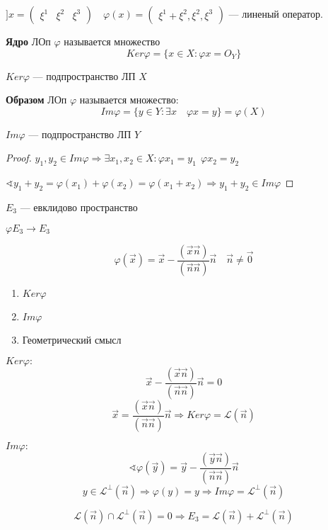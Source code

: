 

\cfoot{}



$] x = \begin{pmatrix}
    \xi^1 & \xi^2 & \xi^3
\end{pmatrix} \quad \varphi(x) = \begin{pmatrix}
    \xi^1+\xi^2, \xi^2, \xi^3
\end{pmatrix}$ --- линеный оператор.

\begin{definition}
    \textbf{Ядро} ЛОп $\varphi$ называется множество
    $$Ker \varphi = \{ x\in X : \varphi x = O_Y\}$$
\end{definition}
\begin{remark}
    $Ker \varphi$ --- подпространство ЛП $X$
\end{remark}

\begin{definition}
    \textbf{Образом} ЛОп $\varphi$ называется множество:
    $$Im \varphi = \{y\in Y : \exists x \quad \varphi x = y\} = \varphi(X)$$
\end{definition}
\begin{remark}
    $Im \varphi$ --- подпространство ЛП $Y$
\end{remark}
\begin{proof}
    $y_1, y_2\in Im \varphi \Rightarrow \exists x_1, x_2 \in X : \varphi x_1=y_1 \ \ \varphi x_2 = y_2$

    $\sphericalangle y_1 + y_2 = \varphi(x_1) + \varphi(x_2) = \varphi(x_1+x_2) \Rightarrow y_1+y_2\in Im \varphi$
\end{proof}

\begin{example}
    $E_3$ --- евклидово пространство

    $\varphi E_3 \to E_3$

    $$\varphi(\vec x) = \vec x - \frac{(\vec x \vec n)}{(\vec n \vec n)}\vec n \quad \vec n\not=\vec 0$$

    \begin{enumerate}
        \item $Ker \varphi$
        \item $Im \varphi$
        \item Геометрический смысл
    \end{enumerate}

    $Ker \varphi:$
    $$\vec x - \frac{(\vec x \vec n)}{(\vec n \vec n)}\vec n=0$$
    $$\vec x = \frac{(\vec x \vec n)}{(\vec n \vec n)}\vec n \Rightarrow Ker \varphi = \mathcal{L}(\vec n)$$

    $Im \varphi:$
    $$\sphericalangle \varphi(\vec y) = \vec y - \frac{(\vec y \vec n)}{(\vec n \vec n)}\vec n$$
    $$y\in\mathcal{L}^\perp (\vec n) \Rightarrow \varphi(y) = y \Rightarrow Im \varphi = \mathcal{L}^\perp (\vec n)$$

    $$\mathcal{L}(\vec n)\cap\mathcal{L}^\perp(\vec n)=0 \Rightarrow E_3=\mathcal{L}(\vec n) + \mathcal{L}^\perp(\vec n)$$
\end{example}

